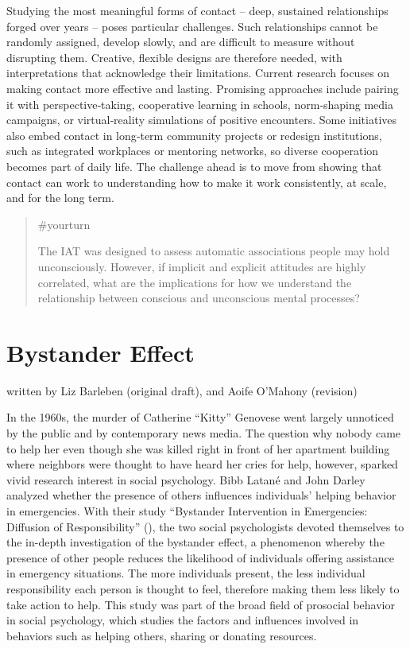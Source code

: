 \documentclass[
  letterpaper,
]{book}
\begin{document}
Studying the most meaningful forms of contact -- deep, sustained
relationships forged over years -- poses particular challenges. Such
relationships cannot be randomly assigned, develop slowly, and are
difficult to measure without disrupting them. Creative, flexible designs
are therefore needed, with interpretations that acknowledge their
limitations. Current research focuses on making contact more effective
and lasting. Promising approaches include pairing it with
perspective‐taking, cooperative learning in schools, norm‐shaping media
campaigns, or virtual‐reality simulations of positive encounters. Some
initiatives also embed contact in long‐term community projects or
redesign institutions, such as integrated workplaces or mentoring
networks, so diverse cooperation becomes part of daily life. The
challenge ahead is to move from showing that contact can work to
understanding how to make it work consistently, at scale, and for the
long term.

\begin{quote}
{\#yourturn}

The IAT was designed to assess automatic associations people may hold
unconsciously. However, if implicit and explicit attitudes are highly
correlated, what are the implications for how we understand the
relationship between conscious and unconscious mental processes?
\end{quote}


\chapter{\texorpdfstring{{Bystander
Effect}}{Bystander Effect}}\label{bystander-effect}

{written by Liz Barleben (original draft), and Aoife O'Mahony
(revision)}

In the 1960s, the murder of Catherine ``Kitty'' Genovese went largely
unnoticed by the public and by contemporary news media. The question why
nobody came to help her even though she was killed right in front of her
apartment building where neighbors were thought to have heard her cries
for help, however, sparked vivid research interest in social psychology.
Bibb Latané and John Darley analyzed whether the presence of others
influences individuals' helping behavior in emergencies. With their
study ``Bystander Intervention in Emergencies: Diffusion of
Responsibility'' (), the two
social psychologists devoted themselves to the in-depth investigation of
the bystander effect, a phenomenon whereby the presence of other people
reduces the likelihood of individuals offering assistance in emergency
situations. The more individuals present, the less individual
responsibility each person is thought to feel, therefore making them
less likely to take action to help. This study was part of the broad
field of prosocial behavior in social psychology, which studies the
factors and influences involved in behaviors such as helping others,
sharing or donating resources.
\end{document}
